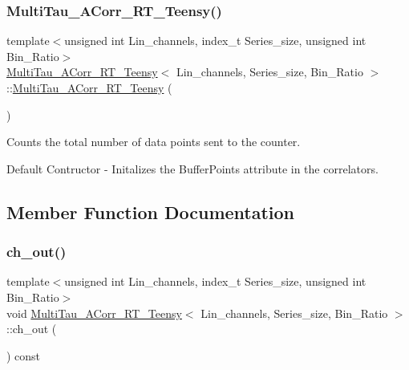 \subsubsection{\texorpdfstring{Multi\+Tau\+\_\+\+A\+Corr\+\_\+\+R\+T\+\_\+\+Teensy()}{MultiTau\_ACorr\_RT\_Teensy()}}
{\footnotesize\ttfamily template$<$unsigned int Lin\+\_\+channels, index\+\_\+t Series\+\_\+size, unsigned int Bin\+\_\+\+Ratio$>$ \\
\hyperlink{classMultiTau__ACorr__RT__Teensy}{Multi\+Tau\+\_\+\+A\+Corr\+\_\+\+R\+T\+\_\+\+Teensy}$<$ Lin\+\_\+channels, Series\+\_\+size, Bin\+\_\+\+Ratio $>$\+::\hyperlink{classMultiTau__ACorr__RT__Teensy}{Multi\+Tau\+\_\+\+A\+Corr\+\_\+\+R\+T\+\_\+\+Teensy} (\begin{DoxyParamCaption}{ }\end{DoxyParamCaption})\hspace{0.3cm}{\ttfamily [inline]}}



Counts the total number of data points sent to the counter. 

Default Contructor -\/ Initalizes the Buffer\+Points attribute in the correlators. 

\subsection{Member Function Documentation}
\mbox{\label{classMultiTau__ACorr__RT__Teensy_a37a29725971f15305398ac7c9c360eac}} 
\subsubsection{\texorpdfstring{ch\+\_\+out()}{ch\_out()}}
{\footnotesize\ttfamily template$<$unsigned int Lin\+\_\+channels, index\+\_\+t Series\+\_\+size, unsigned int Bin\+\_\+\+Ratio$>$ \\
void \hyperlink{classMultiTau__ACorr__RT__Teensy}{Multi\+Tau\+\_\+\+A\+Corr\+\_\+\+R\+T\+\_\+\+Teensy}$<$ Lin\+\_\+channels, Series\+\_\+size, Bin\+\_\+\+Ratio $>$\+::ch\+\_\+out (\begin{DoxyParamCaption}{ }\end{DoxyParamCaption}) const\hspace{0.3cm}{\ttfamily [inline]}}



